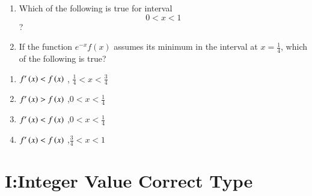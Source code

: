 \documentclass[journal,,12pt,onecolumn]{IEEEtran}
\theoremstyle{remark}
\begin{document}
\begin{enumerate}
\item Which of the following is true for interval     $$0<x<1$$?
\hfill{}

\begin{enumerate}
\end{enumerate}


\item If the function $e^{-x}f(x)$ assumes its minimum in the interval  at $x=\frac{1}{4}$, which of the following is true?
\end{enumerate}

\hfill{}

\begin{enumerate}

\item $f'\left(x\right)<f\left(x\right)$ , $\frac{1}{4}<x<\frac{3}{4}$ \\

\item $f'\left(x\right)>f\left(x\right)$ ,$0<x<\frac{1}{4}$ \\ 

\item $f'\left(x\right)<f\left(x\right)$ ,$0<x<\frac{1}{4}$ \\

\item $f'\left(x\right)<f\left(x\right)$ ,$\frac{3}{4}<x<1$ \\


\end{enumerate}


\section*{I:Integer Value Correct Type}
\end{document}
